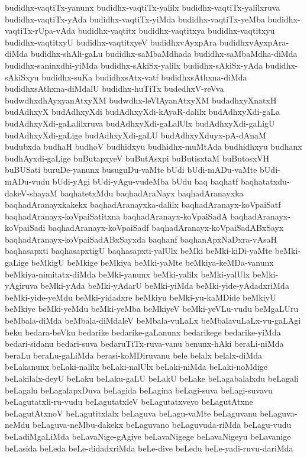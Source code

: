 {budidhx-vaqtiTx-yanunx
budidhx-vaqtiTx-yalilx
budidhx-vaqtiTx-yalilxruva
budidhx-vaqtiTx-yAda
budidhx-vaqtiTx-yiMda
budidhx-vaqtiTx-yeMba
budidhx-vaqtiTx-rUpa-vAda
budidhx-vaqtitx
budidhx-vaqtitxya
budidhx-vaqtitxyu
budidhx-vaqtitxyU
budidhx-vaqtitxyeV
budidhxvAyxpAra
budidhxvAyxpAra-diMda
budidhx-shAli-gaLu
budidhx-saMbaMdhada
budidhx-saMbaMdha-diMda
budidhx-saninxdhi-yiMda
budidhx-sAkiSx-yalilx
budidhx-sAkiSx-yAda
budidhx-sAkiSxyu
budidhx-suKa
budidhxsAtx-vatf
budidhxsAthxna-diMda
budidhxsAthxna-diMdalU
budidhx-huTiTx
budedhxV-reVva
budwdhxdhAyxyanAtxyXM
budwdhx-leVlAyanAtxyXM
budadhxyXnatxH
budAdhxyX
budAdhxyXdi
budAdhxyXdi-kAyaR-dalilx
budAdhxyXdi-gaLa
budAdhxyXdi-gaLalilxruva
budAdhxyXdi-gaLalUlx
budAdhxyXdi-gaLigU
budAdhxyXdi-gaLige
budAdhxyXdi-gaLU
budAdhxyXduyx-pA-dAnaM
budubxda
budhaH
budhoV
budhidxyu
budhidhx-muMtAda
budhidhxyu
budhanx
budhAyxdi-gaLige
buButapxyeV
buButAsxpi
buButisxtaM
buButosxVH
buBUSati
buruDe-yanunx
busuguDu-vaMte
bUdi
bUdi-mADu-vaMte
bUdi-mADu-vudu
bUdi-yAgi
bUdi-yAgu-vudeMba
bUdu
baq
baqhatf
baqhatatxdu-dakeV-shayaM
baqhatetxMdu
baqhadAraNayx
baqhadAranayxka
baqhadAranayxkakekx
baqhadAranayxka-dalilx
baqhadAranayx-koVpaiSatf
baqhadAranayx-koVpaiSatitxna
baqhadAranayx-koVpaiSadA
baqhadAranayx-koVpaiSadi
baqhadAranayx-koVpaiSadf
baqhadAranayx-koVpaiSadABxSayx
baqhadAranayx-koVpaiSadABxSayxda
baqhanf
baqhanApxNaDxra-vAsaH
baqhasapxti
baqhasapxtigU
baqhasapxti-yalUlx
beMki
beMki-kiDi-yaMte
beMki-gaLige
beMkigU
beMkige
beMkiya
beMki-yaMte
beMkiya-keMDa-vanunx
beMkiya-nimitatx-diMda
beMki-yanunx
beMki-yalilx
beMki-yalUlx
beMki-yAgiruva
beMki-yAda
beMki-yAdarU
beMki-yiMda
beMki-yide-yAdadxriMda
beMki-yide-yeMdu
beMki-yidadxre
beMkiyu
beMki-yu-kaMDide
beMkiyU
beMkiye
beMki-yeMdu
beMki-yeMba
beMkiyeV
beMki-yeVLu-vudu
beMgaLUru
beMbala-diMda
beMbala-diMdaleV
beMbala-vuLaLx
beMbalavuLaLx-vu-gaLAgi
beku
bedara-beVku
bedarike
bedarike-gaLanunx
bedarikege
bedarike-yiMda
bedari-sidanu
bedari-suva
bedaruTiTx-ruva-vanu
benunx-hAki
beraLi-niMda
beraLu
beraLu-gaLiMda
berasi-koMDiruvanu
bele
belalx
belalx-diMda
beLakanunx
beLaki-nalilx
beLaki-nalUlx
beLaki-niMda
beLaki-noMdige
beLakilalx-deyU
beLaku
beLaku-gaLU
beLakU
beLake
beLagabalalxdu
beLagali
beLagalu
beLagalapxDuva
beLagida
beLagina
beLagi-suva
beLagi-suvavu
beLagutatxli-ru-vudu
beLagutatxleV
beLagutatxveyo
beLagutAtxne
beLagutAtxnoV
beLagutitxlalx
beLaguva
beLagu-vaMte
beLaguvanu
beLaguva-neMdu
beLaguva-neMbu-dakekx
beLaguvano
beLaguvuda-riMda
beLagu-vudu
beLadiMgaLiMda
beLavaNige-gAgiye
beLavaNigege
beLavaNigeyu
beLavanige
beLasida
beLeda
beLe-didadxriMda
beLe-dive
beLedu
beLe-yadi-ruvu-dariMda
}
